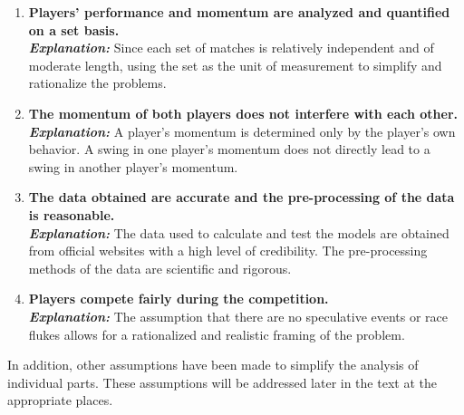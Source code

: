 \documentclass[12pt]{article}  %
\begin{document}
\begin{enumerate}
	\item \textbf{Players' performance and momentum are analyzed and quantified on a set basis.}\\
	\textbf{\textit{Explanation:}} Since each set of matches is relatively independent and of moderate length, using the set as the unit of measurement to simplify and rationalize the problems.
	\item \textbf{The momentum of both players does not interfere with each other.}\\
	\textbf{\textit{Explanation:}} A player's momentum is determined only by the player's own behavior. A swing in one player's momentum does not directly lead to a swing in another player's momentum.
	\item \textbf{The data obtained are accurate and the pre-processing of the data is reasonable.}\\
	\textbf{\textit{Explanation:}} The data used to calculate and test the models are obtained from official websites with a high level of credibility. The pre-processing methods of the data are scientific and rigorous.
	\item \textbf{Players compete fairly during the competition.}\\
	\textbf{\textit{Explanation:}} The assumption that there are no speculative events or race flukes allows for a rationalized and realistic framing of the problem. 
\end{enumerate}

In addition, other assumptions have been made to simplify the analysis of individual parts. These assumptions will be addressed later in the text at the appropriate places.
\end{document}
